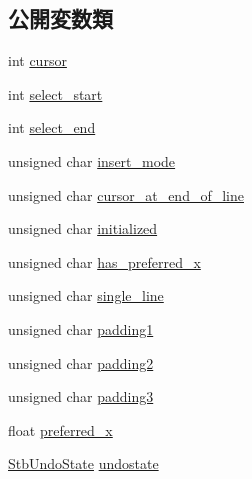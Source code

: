\subsection*{公開変数類}
\begin{DoxyCompactItemize}
\item 
int \mbox{\hyperlink{struct_im_gui_stb_1_1_s_t_b___textedit_state_a8656ac706fba8cc8cbcde46f18437c72}{cursor}}
\item 
int \mbox{\hyperlink{struct_im_gui_stb_1_1_s_t_b___textedit_state_ac3078352e3b28aeb7afcf08f113d9640}{select\+\_\+start}}
\item 
int \mbox{\hyperlink{struct_im_gui_stb_1_1_s_t_b___textedit_state_ab5bcff874696e23964ef779f4d19a07d}{select\+\_\+end}}
\item 
unsigned char \mbox{\hyperlink{struct_im_gui_stb_1_1_s_t_b___textedit_state_a1c918a228338ab3a1c0b640c3d98df93}{insert\+\_\+mode}}
\item 
unsigned char \mbox{\hyperlink{struct_im_gui_stb_1_1_s_t_b___textedit_state_ab4494b7f240ddb36f39ed841b341c7a3}{cursor\+\_\+at\+\_\+end\+\_\+of\+\_\+line}}
\item 
unsigned char \mbox{\hyperlink{struct_im_gui_stb_1_1_s_t_b___textedit_state_a88a83a49d1aecb9270a57bac07527b9b}{initialized}}
\item 
unsigned char \mbox{\hyperlink{struct_im_gui_stb_1_1_s_t_b___textedit_state_ac118037861698c8a0921012799707b68}{has\+\_\+preferred\+\_\+x}}
\item 
unsigned char \mbox{\hyperlink{struct_im_gui_stb_1_1_s_t_b___textedit_state_aa3bde2b0354fbdc2413dbc9a8aaef9c7}{single\+\_\+line}}
\item 
unsigned char \mbox{\hyperlink{struct_im_gui_stb_1_1_s_t_b___textedit_state_abd63300ec47cc0b4cb36e21537d2cc59}{padding1}}
\item 
unsigned char \mbox{\hyperlink{struct_im_gui_stb_1_1_s_t_b___textedit_state_aa6e2882bd1752493ba8acd000d247325}{padding2}}
\item 
unsigned char \mbox{\hyperlink{struct_im_gui_stb_1_1_s_t_b___textedit_state_a3ef1e2f20a9c518a786a0cf51b474828}{padding3}}
\item 
float \mbox{\hyperlink{struct_im_gui_stb_1_1_s_t_b___textedit_state_a69ad8390f04856d8833d2355d299e74a}{preferred\+\_\+x}}
\item 
\mbox{\hyperlink{struct_im_gui_stb_1_1_stb_undo_state}{Stb\+Undo\+State}} \mbox{\hyperlink{struct_im_gui_stb_1_1_s_t_b___textedit_state_aa53b0d0fcbe15632d67f42bc37e6888d}{undostate}}
\end{DoxyCompactItemize}


